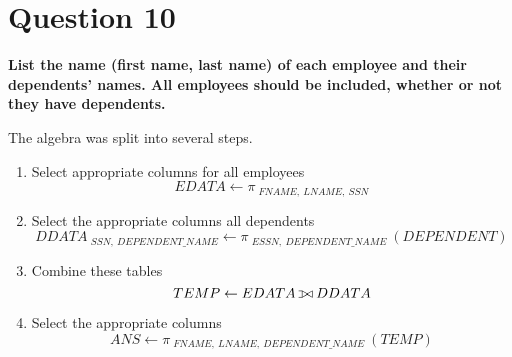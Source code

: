 \documentclass{article}
\def\ojoin{\setbox0=\hbox{$\bowtie$}%
  \rule[-.02ex]{.25em}{.4pt}\llap{\rule[\ht0]{.25em}{.4pt}}}
\def\leftouterjoin{\mathbin{\ojoin\mkern-5.8mu\bowtie}}
\begin{document}
\section{Question 10}

    \textbf{List the name (first name, last name) of each employee and their dependents' names.  All employees should be included, whether or not they have dependents.}
    
    The algebra was split into several steps.

    \begin{enumerate}
        \item Select appropriate columns for all employees
        \[ EDATA \gets \pi \: _{FNAME, \: LNAME, \: SSN} \]
        \item Select the appropriate columns all dependents
        \[ DDATA \: _{SSN, \: DEPENDENT\_NAME} \gets \pi \: _{ESSN, \: DEPENDENT\_NAME} \: (DEPENDENT) \]
        \item Combine these tables
        \[ TEMP \gets EDATA \leftouterjoin DDATA \]
        \item Select the appropriate columns
        \[ ANS \gets \pi \: _{FNAME, \: LNAME, \: DEPENDENT\_NAME} \: (TEMP) \]
    \end{enumerate}
    
\end{document}
